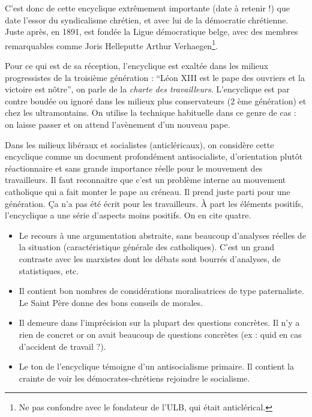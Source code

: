 \documentclass[12pt]{report}
\begin{document}
C'est donc de cette encyclique extrêmement importante (date à retenir !) que date l'essor du syndicalisme chrétien, et avec lui de la démocratie chrétienne. Juste après, en 1891, est fondée la Ligue démocratique belge, avec des membres remarquables comme Joris Helleputte Arthur Verhaegen\footnote{Ne pas confondre avec le fondateur de l'ULB, qui était anticlérical.}.

Pour ce qui est de sa réception, l'encyclique est exaltée dans les milieux progressistes de la troisième
génération : \enquote{Léon XIII est le pape des ouvriers et la victoire est nôtre}, on parle de la \emph{charte des travailleurs}.
L'encyclique est par contre boudée ou ignoré dans les milieux plus
conservateurs (2 ème génération) et chez les ultramontains. On utilise la technique habituelle dans ce genre de cas :
on laisse passer et on attend l’avènement d’un nouveau pape.

Dans les milieux libéraux et socialistes (anticléricaux), on considère cette encyclique comme un document
profondément antisocialiste, d’orientation plutôt réactionnaire et sans grande importance réelle pour le
mouvement des travailleurs. 
Il faut reconnaitre que c’est un problème interne au mouvement
catholique qui a fait monter le pape au créneau. Il prend juste parti pour une génération. Ça
n’a pas été écrit pour les travailleurs. À part les éléments positifs, l’encyclique a une série
d’aspects moins positifs. On en cite quatre.

\begin{itemize}
	\item Le recours à une argumentation abstraite, sans beaucoup d’analyses réelles de la situation (caractéristique générale des catholiques). C’est un grand contraste avec les marxistes dont les débats sont bourrés d’analyses, de statistiques, etc.
	\item Il contient bon nombres de considérations moralisatrices de type paternaliste. Le Saint Père donne des bons conseils de morales.
	\item Il demeure dans l’imprécision sur la plupart des questions concrètes. Il n’y a rien de concret or on avait beaucoup de questions concrètes (ex : quid en cas d’accident de travail ?).
	\item Le ton de l’encyclique témoigne d’un antisocialisme primaire. Il contient la crainte de voir les démocrates-chrétiens rejoindre le socialisme.
\end{itemize}
\end{document}
